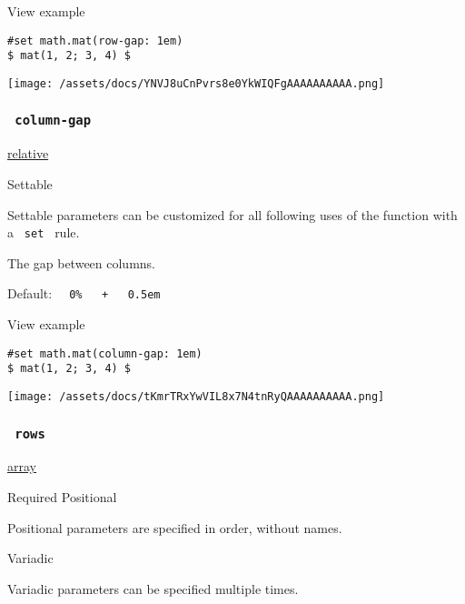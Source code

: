 
View example

\begin{verbatim}
#set math.mat(row-gap: 1em)
$ mat(1, 2; 3, 4) $
\end{verbatim}

\texttt{[image: /assets/docs/YNVJ8uCnPvrs8e0YkWIQFgAAAAAAAAAA.png]}

\subsubsection{\texorpdfstring{\texttt{\ column-gap\ }}{ column-gap }}\label{parameters-column-gap}

\href{/docs/reference/layout/relative/}{relative}

{{ Settable }}

\label{parameters-column-gap-settable-tooltip}
Settable parameters can be customized for all following uses of the
function with a \texttt{\ set\ } rule.

The gap between columns.

Default:
\texttt{\ }{\texttt{\ 0\%\ }}\texttt{\ }{\texttt{\ +\ }}\texttt{\ }{\texttt{\ 0.5em\ }}\texttt{\ }


View example

\begin{verbatim}
#set math.mat(column-gap: 1em)
$ mat(1, 2; 3, 4) $
\end{verbatim}

\texttt{[image: /assets/docs/tKmrTRxYwVIL8x7N4tnRyQAAAAAAAAAA.png]}

\subsubsection{\texorpdfstring{\texttt{\ rows\ }}{ rows }}\label{parameters-rows}

\href{/docs/reference/foundations/array/}{array}

{Required} {{ Positional }}

\label{parameters-rows-positional-tooltip}
Positional parameters are specified in order, without names.

{{ Variadic }}

\label{parameters-rows-variadic-tooltip}
Variadic parameters can be specified multiple times.

